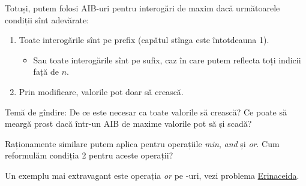 Totuși, putem folosi AIB-uri pentru interogări de maxim dacă următoarele condiții sînt adevărate:

\begin{enumerate}
  \item Toate interogările sînt pe prefix (capătul stînga este întotdeauna 1).
  \begin{itemize}
    \item Sau toate interogările sînt pe sufix, caz în care putem reflecta toți indicii față de $n$.
  \end{itemize}
  \item Prin modificare, valorile pot doar să crească.
\end{enumerate}

Temă de gîndire: De ce este necesar ca toate valorile să crească? Ce poate să meargă prost dacă într-un AIB de maxime valorile pot să și scadă?

Raționamente similare putem aplica pentru operațiile \textit{min}, \textit{and} și \textit{or}. Cum reformulăm condiția 2 pentru aceste operații?

Un exemplu mai extravagant este operația \textit{or} pe -uri, vezi problema \href{https://kilonova.ro/problems/210}{Erinaceida}.
